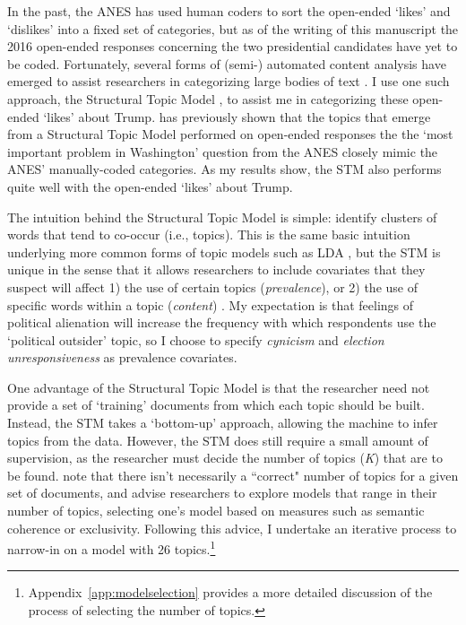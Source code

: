 \documentclass[12pt]{article}
\begin{document}
In the past, the ANES has used human coders to sort the open-ended `likes' and `dislikes' into a fixed set of categories, but as of the writing of this manuscript the 2016 open-ended responses concerning the two presidential candidates have yet to be coded. Fortunately, several forms of (semi-) automated content analysis have emerged to assist researchers in categorizing large bodies of text \parencite{grimmer2013text}. I use one such approach, the Structural Topic Model \parencite{roberts2019stm}, to assist me in categorizing these open-ended `likes' about Trump. \textcite{roberts2014structural} has previously shown that the topics that emerge from a Structural Topic Model performed on open-ended responses the the `most important problem in Washington' question from the ANES closely mimic the ANES' manually-coded categories. As my results show, the STM also performs quite well with the open-ended `likes' about Trump. 

The intuition behind the Structural Topic Model is simple: identify clusters of words that tend to co-occur (i.e., topics). This is the same basic intuition underlying more common forms of topic models such as LDA \parencite{Blei2003}, but the STM is unique in the sense that it allows researchers to include covariates that they suspect will affect 1) the use of certain topics (\textit{prevalence}), or 2) the use of specific words within a topic (\textit{content}) \parencite{roberts2014structural}. My expectation is that feelings of political alienation will increase the frequency with which respondents use the `political outsider' topic, so I choose to specify \textit{cynicism} and \textit{election unresponsiveness} as prevalence covariates.

One advantage of the Structural Topic Model is that the researcher need not provide a set of `training' documents from which each topic should be built. Instead, the STM takes a `bottom-up' approach, allowing the machine to infer topics from the data. However, the STM does still require a small amount of supervision, as the researcher must decide the number of topics (\textit{K}) that are to be found. \textcite{roberts2019stm} note that there isn't necessarily a ``correct" number of topics for a given set of documents, and advise researchers to explore models that range in their number of topics, selecting one's model based on measures such as semantic coherence or exclusivity. Following this advice, I undertake an iterative process to narrow-in on a model with 26 topics.\footnote{Appendix~\ref{app:modelselection} provides a more detailed discussion of the process of selecting the number of topics.}
\end{document}
